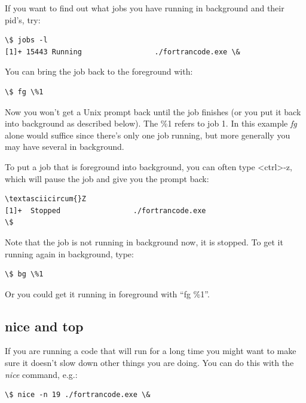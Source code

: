 \documentclass[letterpaper,10pt,english]{sphinxmanual}
\begin{document}
If you want to find out what jobs you have running in background and their
pid's, try:

\begin{Verbatim}[commandchars=\\\{\}]
\$ jobs -l
[1]+ 15443 Running                 ./fortrancode.exe \&
\end{Verbatim}

You can bring the job back to the foreground with:

\begin{Verbatim}[commandchars=\\\{\}]
\$ fg \%1
\end{Verbatim}

Now you won't get a Unix prompt back until the job finishes (or you put it
back into background as described below). The \%1 refers to job 1.  In this
example \emph{fg} alone would suffice since there's only one job running, but
more generally you may have several in background.

To put a job that is foreground into background, you can often type
\textless{}ctrl\textgreater{}-z, which will pause the job and give you the prompt back:

\begin{Verbatim}[commandchars=\\\{\}]
\textasciicircum{}Z
[1]+  Stopped                 ./fortrancode.exe
\$
\end{Verbatim}

Note that the job is not running in background now, it is stopped.  To get
it running again in background, type:

\begin{Verbatim}[commandchars=\\\{\}]
\$ bg \%1
\end{Verbatim}

Or you could get it running in foreground with ``fg \%1''.


\subsection{nice and top}
\label{unix:nice-and-top}
If you are running a code that will run for a long time you might want to
make sure it doesn't slow down other things you are doing.  You can do this
with the \emph{nice} command, e.g.:

\begin{Verbatim}[commandchars=\\\{\}]
\$ nice -n 19 ./fortrancode.exe \&
\end{Verbatim}
\end{document}
